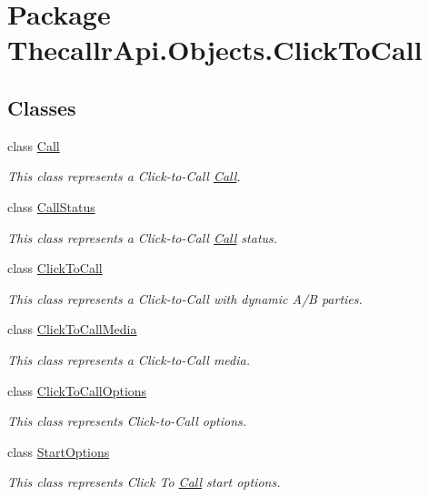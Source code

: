 \hypertarget{namespace_thecallr_api_1_1_objects_1_1_click_to_call}{\section{Package Thecallr\+Api.\+Objects.\+Click\+To\+Call}
\label{namespace_thecallr_api_1_1_objects_1_1_click_to_call}
}
\subsection*{Classes}
\begin{DoxyCompactItemize}
\item 
class \hyperlink{class_thecallr_api_1_1_objects_1_1_click_to_call_1_1_call}{Call}
\begin{DoxyCompactList}\small\item\em This class represents a Click-\/to-\/\+Call \hyperlink{class_thecallr_api_1_1_objects_1_1_click_to_call_1_1_call}{Call}. \end{DoxyCompactList}\item 
class \hyperlink{class_thecallr_api_1_1_objects_1_1_click_to_call_1_1_call_status}{Call\+Status}
\begin{DoxyCompactList}\small\item\em This class represents a Click-\/to-\/\+Call \hyperlink{class_thecallr_api_1_1_objects_1_1_click_to_call_1_1_call}{Call} status. \end{DoxyCompactList}\item 
class \hyperlink{class_thecallr_api_1_1_objects_1_1_click_to_call_1_1_click_to_call}{Click\+To\+Call}
\begin{DoxyCompactList}\small\item\em This class represents a Click-\/to-\/\+Call with dynamic A/\+B parties. \end{DoxyCompactList}\item 
class \hyperlink{class_thecallr_api_1_1_objects_1_1_click_to_call_1_1_click_to_call_media}{Click\+To\+Call\+Media}
\begin{DoxyCompactList}\small\item\em This class represents a Click-\/to-\/\+Call media. \end{DoxyCompactList}\item 
class \hyperlink{class_thecallr_api_1_1_objects_1_1_click_to_call_1_1_click_to_call_options}{Click\+To\+Call\+Options}
\begin{DoxyCompactList}\small\item\em This class represents Click-\/to-\/\+Call options. \end{DoxyCompactList}\item 
class \hyperlink{class_thecallr_api_1_1_objects_1_1_click_to_call_1_1_start_options}{Start\+Options}
\begin{DoxyCompactList}\small\item\em This class represents Click To \hyperlink{class_thecallr_api_1_1_objects_1_1_click_to_call_1_1_call}{Call} start options. \end{DoxyCompactList}\end{DoxyCompactItemize}
